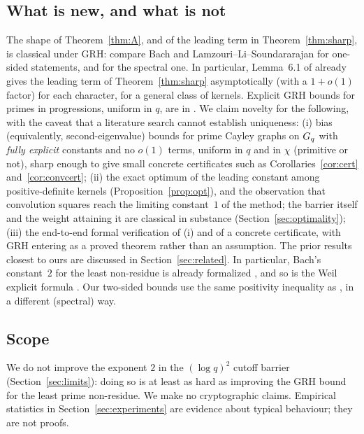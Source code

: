 \subsection{What is new, and what is not}
The shape of Theorem~\ref{thm:A}, and of the leading term in Theorem~\ref{thm:sharp}, is classical
under GRH: compare Bach \cite{bach1990} and Lamzouri--Li--Soundararajan \cite{lls2015} for one-sided
statements, and \cite{jmv2009} for the spectral one. In particular, Lemma~6.1 of \cite{lls2015} already gives the leading term of
Theorem~\ref{thm:sharp} asymptotically (with a $1+o(1)$ factor) for each character, for a general class of kernels. Explicit GRH bounds for
primes in progressions, uniform in $q$, are in \cite{ehp2022}. We claim novelty for the following, with the caveat that a
literature search cannot establish uniqueness:
(i) bias (equivalently, second-eigenvalue) bounds for prime Cayley graphs on $G_q$ with \emph{fully explicit}
constants and no $o(1)$ terms, uniform in $q$ and in $\chi$ (primitive or not), sharp enough to give small concrete certificates
such as Corollaries~\ref{cor:cert} and~\ref{cor:convcert};
(ii) the exact optimum of the leading constant among positive-definite kernels (Proposition~\ref{prop:opt}), and the
observation that convolution squares reach the limiting constant~$1$ of the method; the barrier itself and the weight attaining it
are classical in substance (Section~\ref{sec:optimality});
(iii) the end-to-end formal verification of (i) and of a concrete certificate, with GRH entering as a
proved theorem rather than an assumption.
The prior results closest to ours are discussed in Section~\ref{sec:related}. In particular, Bach's
constant~$2$ for the least non-residue is already formalized \cite{grhmiller}, and so is the Weil
explicit formula \cite{zeta23}. Our two-sided bounds use the same positivity inequality as
\cite{grhmiller}, in a different (spectral) way.

\subsection{Scope}
We do not improve the exponent $2$ in the $(\log q)^2$ cutoff barrier (Section~\ref{sec:limits}):
doing so is at least as hard as improving the GRH bound for the least prime non-residue. We make no
cryptographic claims. Empirical statistics in Section~\ref{sec:experiments} are evidence about typical
behaviour; they are not proofs.
